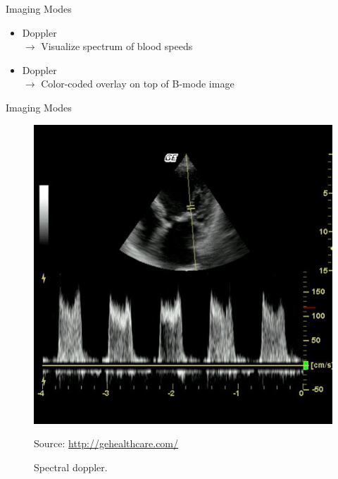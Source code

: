 \begin{frame}{Imaging Modes \cont}

    \vspace{0.3cm}
    \begin{itemize}
        \setlength\itemsep{0.3cm}
        \item {} Doppler\\
              $\rightarrow$ Visualize spectrum of blood speeds
        \item {} Doppler\\
              $\rightarrow$ Color-coded overlay on top of B-mode image
    \end{itemize}


\end{frame}


\begin{frame}{Imaging Modes \cont}

    \begin{figure}
        \centering
        \includegraphics[height=0.7\textheight]{images/spectral_doppler_ge.jpg}
        \caption{\normalsize Spectral doppler. }
        \begin{flushright}
            \tiny Source: \url{http://gehealthcare.com/}
        \end{flushright}
    \end{figure}
\end{frame}


